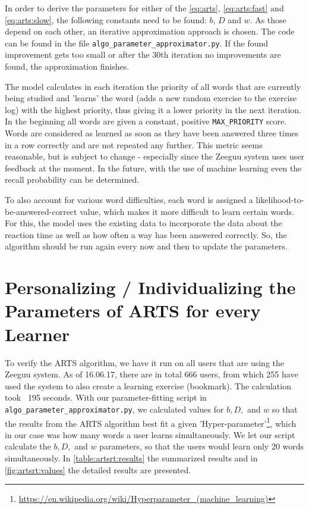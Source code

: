 \documentclass{article}
\begin{document}
In order to derive the parameters for either of the \autoref{eq:arts}, \autoref{eq:arts:fast} and \autoref{eq:arts:slow}, the following constants need to be found: $b$, $D$ and $w$. As those depend on each other, an iterative approximation approach is chosen. The code can be found in the file \lstinline|algo_parameter_approximator.py|. If the found improvement gets too small or after the 30th iteration no improvements are found, the approximation finishes.

The model calculates in each iteration the priority of all words that are currently being studied and 'learns' the word  (adds a new random exercise to the exercise log) with the highest priority, thus giving it a lower priority in the next iteration. In the beginning all words are given a constant, positive \lstinline|MAX_PRIORITY| score. Words are considered as learned as soon as they have been answered three times in a row correctly and are not repeated any further. This metric seems reasonable, but is subject to change - especially since the Zeeguu system uses user feedback at the moment. In the future, with the use of machine learning even the recall probability can be determined.

To also account for various word difficulties, each word is assigned a likelihood-to-be-answered-correct value, which makes it more difficult to learn certain words. For this, the model uses the existing data to incorporate the data about the reaction time as well as how often a way has been answered correctly. So, the algorithm should be run again every now and then to update the parameters.



\section{Personalizing / Individualizing the Parameters of ARTS for every Learner}

To verify the ARTS algorithm, we have it run on all users that are using the Zeeguu system. As of 16.06.17, there are in total 666 users, from which 255 have used the system to also create a learning exercise (bookmark). The calculation took ~195 seconds. With our parameter-fitting script in \lstinline|algo_parameter_approximator.py|, we calculated values for $b, D,$ and $w$ so that the results from the ARTS algorithm best fit a given 'Hyper-parameter'\footnote{\url{https://en.wikipedia.org/wiki/Hyperparameter_(machine_learning)}}, which in our case was how many words a user learns simultaneously. We let our script calculate the $b, D,$ and $w$ parameters, so that the users would learn only 20 words simultaneously. In \autoref{table:artsrt:results} the summarized results and in \autoref{fig:artsrt:values} the detailed results are presented.
\end{document}
